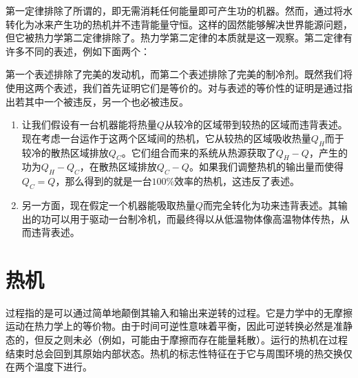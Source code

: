 
	第一定律排除了所谓的，即无需消耗任何能量即可产生功的机器。然而，通过将水转化为冰来产生功的热机并不违背能量守恒。这样的固然能够解决世界能源问题，但它被热力学第二定律排除了。热力学第二定律的本质就是这一观察。第二定律有许多不同的表述，例如下面两个：



	第一个表述排除了完美的发动机，而第二个表述排除了完美的制冷剂。既然我们将使用这两个表述，我们首先证明它们是等价的。对{\kelvin}与{\clausius}表述的等价性的证明是通过指出若其中一个被违反，另一个也必被违反。

	\begin{enumerate}[label=(\alph*)]
		\item 让我们假设有一台机器能将热量$Q$从较冷的区域带到较热的区域而违背{\clausius}表述。现在考虑一台运作于这两个区域间的热机，它从较热的区域吸收热量$Q_H$而于较冷的散热区域排放$Q_C$。它们组合而来的系统从热源获取了\(Q_H-Q\)，产生的功为\(Q_H-Q_C\)，在散热区域排放\(Q_C-Q\)。如果我们调整热机的输出量而使得\(Q_C=Q\)，那么得到的就是一台\(100\%\)效率的热机，这违反了{\kelvin}表述。
		\item 另一方面，现在假定一个机器能吸取热量$Q$而完全转化为功来违背{\kelvin}表述。其输出的功可以用于驱动一台制冷机，而最终得以从低温物体像高温物体传热，从而违背{\clausius}表述。
	\end{enumerate}

\section{{\carnot}热机}

	过程指的是可以通过简单地颠倒其输入和输出来逆转的过程。它是力学中的无摩擦运动在热力学上的等价物。由于时间可逆性意味着平衡，因此可逆转换必然是准静态的，但反之则未必（例如，可能由于摩擦而存在能量耗散）。运行的热机在过程结束时总会回到其原始内部状态。{\carnot}热机的标志性特征在于它与周围环境的热交换仅在两个温度下进行。

